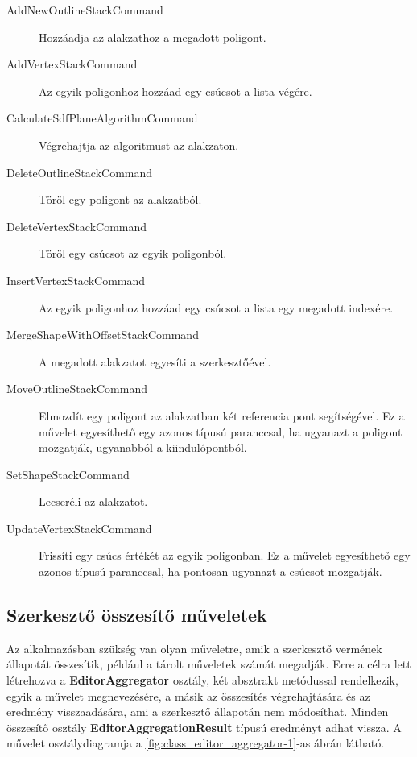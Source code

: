 \begin{description}
    \item[AddNewOutlineStackCommand] Hozzáadja az alakzathoz a megadott poligont.
    \item[AddVertexStackCommand] Az egyik poligonhoz hozzáad egy csúcsot a lista végére.
    \item[CalculateSdfPlaneAlgorithmCommand] Végrehajtja az algoritmust az alakzaton.
    \item[DeleteOutlineStackCommand] Töröl egy poligont az alakzatból.
    \item[DeleteVertexStackCommand] Töröl egy csúcsot az egyik poligonból.
    \item[InsertVertexStackCommand] Az egyik poligonhoz hozzáad egy csúcsot a lista egy megadott indexére.
    \item[MergeShapeWithOffsetStackCommand] A megadott alakzatot egyesíti a szerkesztőével.
    \item[MoveOutlineStackCommand] Elmozdít egy poligont az alakzatban két referencia pont segítségével. Ez a művelet egyesíthető egy azonos típusú paranccsal, ha ugyanazt a poligont mozgatják, ugyanabból a kiindulópontból.
    \item[SetShapeStackCommand] Lecseréli az alakzatot.
    \item[UpdateVertexStackCommand] Frissíti egy csúcs értékét az egyik poligonban. Ez a művelet egyesíthető egy azonos típusú paranccsal, ha pontosan ugyanazt a csúcsot mozgatják.
\end{description}

\subsection{Szerkesztő összesítő műveletek}

Az alkalmazásban szükség van olyan műveletre, amik a szerkesztő vermének állapotát összesítik, például a tárolt műveletek számát megadják. Erre a célra lett létrehozva a \textbf{EditorAggregator} osztály, két absztrakt metódussal rendelkezik, egyik a művelet megnevezésére, a másik az összesítés végrehajtására és az eredmény visszaadására, ami a szerkesztő állapotán nem módosíthat. Minden összesítő osztály \textbf{EditorAggregationResult} típusú eredményt adhat vissza. A művelet osztálydiagramja a \ref{fig:class_editor_aggregator-1}-as ábrán látható.

